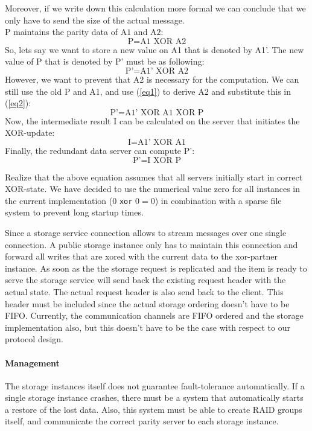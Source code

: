 \documentclass[12pt,a4paper]{scrartcl}
\begin{document}
Moreover, if we write down this calculation more formal we can conclude that we only have to send the size of the actual message. \\ $\text{P}$ maintains the parity data of  $\text{A1}$ and $\text{A2}$:
\begin{equation}\label{eq1}
\text{P} = \text{A1} \text{ XOR } \text{A2}
\end{equation}
So, lets say we want to store a new value on A1 that is denoted by A1’. The new value of P that is denoted by P’ must be as following:
\begin{equation}\label{eq2}
\text{P’} = \text{A1’} \text{ XOR } \text{A2}
\end{equation}
However, we want to prevent that A2 is necessary for the computation. We can still use the old P and A1, and use (\ref{eq1}) to derive A2 and substitute this in (\ref{eq2}):
$$\text{P’} = \text{A1’} \text{ XOR } \text{A1} \text{ XOR } \text{P}$$
Now, the intermediate result I can be calculated on the server that initiates the XOR-update:
$$\text{I} = \text{A1’} \text{ XOR } \text{A1}$$
Finally, the redundant data server can compute P’:
$$\text{P’} = \text{I} \text{ XOR } \text{P}$$

Realize that the above equation assumes that all servers initially start in correct XOR-state. We have decided to use the numerical value zero for all instances in the current implementation ($0$ \verb|xor| $0 = 0$) in combination with a sparse file system to prevent long startup times.

Since a storage service connection allows to stream messages over one single connection. A public storage instance only has to maintain this connection and forward all writes that are xored with the current data to the xor-partner instance. As soon as the the storage request is replicated and the item is ready to serve the storage service will send back the existing request header with the actual state. The actual request header is also send back to the client. This header must be included since the actual storage ordering doesn't have to be FIFO. Currently, the communication channels are FIFO ordered and the storage implementation also, but this doesn't have to be the case with respect to our protocol design.

\paragraph{Management}
The storage instances itself does not guarantee fault-tolerance automatically. If a single storage instance crashes, there must be a system that automatically starts a restore of the lost data. Also, this system must be able to create RAID groups itself, and communicate the correct parity server to each storage instance.
\end{document}
